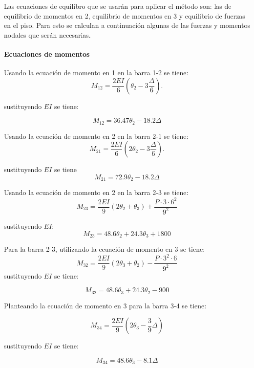 Las ecuaciones de equilibro que se usarán para aplicar el método son: las de equilibrio de momentos en 2, equilibrio de momentos en 3 y equilibrio de fuerzas en el piso. Para esto se calculan a continuación algunas de las fuerzas y momentos nodales que serán necesarias.

\paragraph{Ecuaciones de momentos}

Usando la ecuación de momento en 1 en la barra 1-2 se tiene:
$$
M_{12} = \frac{2EI}{6} \left( \theta_2 - 3 \frac{ \Delta } {6} \right).
$$

sustituyendo $EI$ se tiene:

\begin{equation}
\boxed{
	M_{12}  = 36.47 \theta_2 - 18.2 \Delta}
\end{equation}

Usando la ecuación de momento en 2 en la barra 2-1 se tiene:
$$
	M_{21} = \frac{2EI}{6} \left( 2\theta_2 - 3 \frac{ \Delta } {6} \right).
$$

sustituyendo $EI$ se tiene%
\begin{equation}
\boxed{
M_{21}  = 72.9 \theta_2 - 18.2 \Delta}
\end{equation}
 
Usando la ecuación de momento en 2 en la barra 2-3 se tiene:
$$
	M_{23} = \frac{2EI}{9} \left(2\theta_2 +\theta_3 \right) + \frac{ P \cdot 3 \cdot 6^2}{9^2}
$$

sustituyendo $EI$:
%
\begin{equation}
\boxed{
M_{23} = 48.6 \theta_2 + 24.3 \theta_3  + 1800
}
\end{equation}

Para la barra 2-3, utilizando la ecuación de momento en 3 se tiene:
$$
M_{32} = \frac{2EI}{9} \left(2\theta_3 +\theta_2 \right) - \frac{P \cdot 3^2 \cdot 6}{9^2}
$$
sustituyendo $EI$ se tiene:

\begin{equation}
\boxed{
M_{32} = 48.6 \theta_3 + 24.3 \theta_2 - 900
}
\end{equation}

Planteando la ecuación de momento en 3 para la barra 3-4 se tiene:

$$
M_{34} = \frac{2EI}{9} \left(2\theta_3 - \frac{3}{9} \Delta \right)
$$

sustituyendo $EI$ se tiene:

\begin{equation}
\boxed{
	M_{34} = 48.6 \theta_3 - 8.1 \Delta
}
\end{equation}

